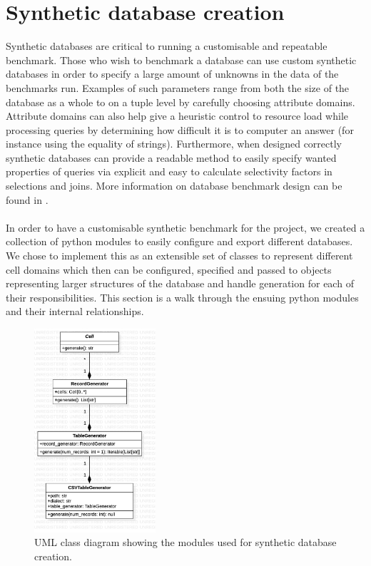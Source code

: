 \section{Synthetic database creation}\label{sec:benchmark:database}
Synthetic databases are critical to running a customisable and repeatable
benchmark. Those who wish to benchmark a database can use custom synthetic
databases in order to specify a large amount of unknowns in the data of the
benchmarks run. Examples of such parameters range from both the size of the
database as a whole to on a tuple level by carefully choosing attribute domains.
Attribute domains can also help give a heuristic control to resource load while
processing queries by determining how difficult it is to computer an answer (for
instance using the equality of strings). Furthermore, when designed correctly synthetic
databases can provide a readable method to easily specify wanted properties of
queries via explicit and easy to calculate selectivity factors in selections and
joins. More information on database benchmark design can be found in
.

\paragraph{} In order to have a customisable synthetic benchmark for the
project, we created a collection of python modules to easily configure and
export different databases. We chose to implement this as an extensible set of
classes to represent different cell domains which then can be configured,
specified and passed to objects representing larger structures of the database
and handle generation for each of their responsibilities. This section is a
walk through the ensuing python modules and their internal relationships.

\begin{figure}
    \centering
    \includegraphics[width=0.4\textwidth]{project/benchmark/database_generation_class_diagram}
    \caption{UML class diagram showing the modules used for synthetic database
    creation.}
    \label{fig:project:benchmark:creation-class-diagram}
\end{figure}

